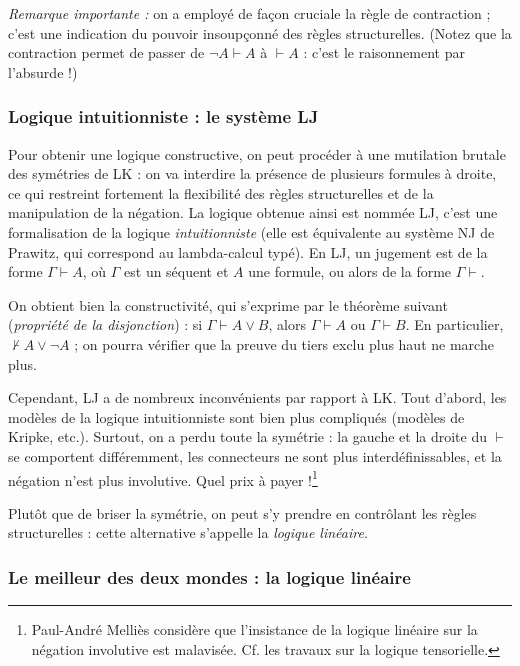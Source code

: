 \documentclass[a4paper, 11pt]{article}
\begin{document}
\emph{Remarque importante :} on a employé de façon cruciale la règle de contraction ; c'est une indication du pouvoir insoupçonné des règles structurelles. (Notez que la contraction permet de passer de $\neg A \vdash A$ à $\vdash A$ : c'est le raisonnement par l'absurde !)

\subsubsection{Logique intuitionniste : le système LJ}

Pour obtenir une logique constructive, on peut procéder à une mutilation brutale des symétries de LK : on va interdire la présence de plusieurs formules à droite, ce qui restreint fortement la flexibilité des règles structurelles et de la manipulation de la négation. La logique obtenue ainsi est nommée LJ, c'est une formalisation de la logique \emph{intuitionniste} (elle est équivalente au système NJ de Prawitz, qui correspond au lambda-calcul typé). En LJ, un jugement est de la forme $\Gamma \vdash A$, où $\Gamma$ est un séquent et $A$ une formule, ou alors de la forme $\Gamma \vdash$.

On obtient bien la constructivité, qui s'exprime par le théorème suivant (\emph{propriété de la disjonction}) : si $\Gamma \vdash A \lor B$, alors $\Gamma \vdash A$ ou $\Gamma \vdash B$. En particulier, $\not\vdash A \lor \neg A$ ; on pourra vérifier que la preuve du tiers exclu plus haut ne marche plus.

Cependant, LJ a de nombreux inconvénients par rapport à LK. Tout d'abord, les modèles de la logique intuitionniste sont bien plus compliqués (modèles de Kripke, etc.). Surtout, on a perdu toute la symétrie : la gauche et la droite du $\vdash$ se comportent différemment, les connecteurs ne sont plus interdéfinissables, et la négation n'est plus involutive. Quel prix à payer !\footnote{Paul-André Melliès considère que l'insistance de la logique linéaire sur la négation involutive est malavisée. Cf. les travaux sur la logique tensorielle.}

Plutôt que de briser la symétrie, on peut s'y prendre en contrôlant les règles structurelles : cette alternative s'appelle la \emph{logique linéaire}.

\subsubsection{Le meilleur des deux mondes : la logique linéaire}
\end{document}
